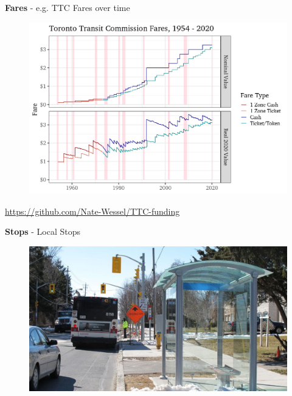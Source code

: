 \documentclass[aspectratio=169]{beamer}
\begin{document}
\begin{frame}
	
	\textbf{Fares} - e.g. TTC Fares over time
	
	\begin{figure}
		\centering
		\includegraphics[width=0.8\linewidth]{images/ttc-fares.png}
	\end{figure}
	
	\tiny\url{https://github.com/Nate-Wessel/TTC-funding}
	
\end{frame}





\begin{frame}
	
	\textbf{Stops} - Local Stops
	
	\begin{figure}
		\centering
		\includegraphics[width=0.8\linewidth]{images/bus_stop_ttc.jpeg}
	\end{figure}
	
\end{frame}
\end{document}
